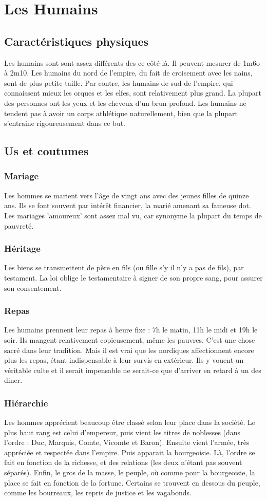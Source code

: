 \section{Les Humains}
\subsection{Caractéristiques physiques}
Les humains sont sont assez différents des ce côté-là. Il peuvent mesurer de 1m6o à 2m10. Les humains du nord de l’empire, du fait de croisement avec les nains, sont de plus petite taille. Par contre, les humains de sud de l’empire, qui connaissent mieux les orques et les elfes, sont relativement plus grand. La plupart des personnes ont les yeux et les cheveux d’un brun profond. Les humains ne tendent pas à avoir un corps athlétique naturellement, bien que la plupart s’entraine rigoureusement dans ce but. 
\subsection{Us et coutumes}
\subsubsection{Mariage}
Les hommes se marient vers l’âge de vingt ans avec des jeunes filles de quinze ans. Ils se font souvent par intérêt financier, la marié amenant sa fameuse dot. Les mariages ’amoureux’ sont assez mal vu, car synonyme la plupart du temps de pauvreté. 
\subsubsection{Héritage}
Les biens se transmettent de père en fils (ou fille s’y il n’y a pas de fils), par testament. La loi oblige le testamentaire à signer de son propre sang, pour assurer son consentement. 
\subsubsection{Repas}
Les humains prennent leur repas à heure fixe : 7h le matin, 11h le midi et 19h le soir. Ils mangent relativement copieusement, même les pauvres. C’est une chose sacré dans leur tradition. Mais il est vrai que les nordiques affectionnent encore plus les repas, étant indispensable à leur survis en extérieur. Ils y vouent un véritable culte et il serait impensable ne serait-ce que d'arriver en retard à un des diner. 
\subsubsection{Hiérarchie}
Les hommes apprécient beaucoup être classé selon leur place dans la société. Le plus haut rang est celui d’empereur, puis vient les titres de noblesses (dans l’ordre : Duc, Marquis, Comte, Vicomte et Baron). Ensuite vient l’armée, très appréciée et respectée dans l’empire. Puis apparait la bourgeoisie. Là, l’ordre se fait en fonction de la richesse, et des relations (les deux n’étant pas souvent séparés). Enfin, le gros de la masse, le peuple, où comme pour la bourgeoisie, la place se fait en fonction de la fortune. Certains se trouvent en dessous du peuple, comme les bourreaux, les repris de justice et les vagabonds. 

